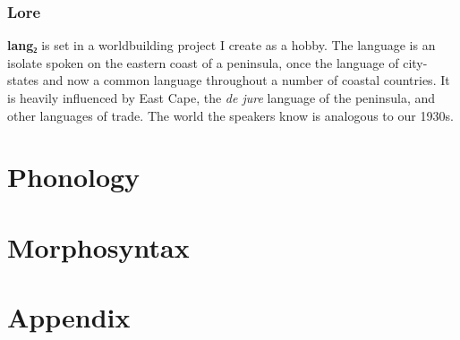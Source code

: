\documentclass[fontsize=12pt,twoside=false,numbers=noenddot]{kaobook}
\newcommand{\langname}{\textbf{lang₂}}
\begin{document}
\section{Lore}
\langname{} is set in a worldbuilding project I create as a hobby. The language is an isolate spoken on the eastern coast of a peninsula, once the language of city-states and now a common language throughout a number of coastal countries. It is heavily influenced by East Cape, the \emph{de jure} language of the peninsula, and other languages of trade. The world the speakers know is analogous to our 1930s.

\mainmatter

 \part{Phonology} 



 \part{Morphosyntax} 









 \part{Appendix} 

\appendix





\backmatter
{}
\end{document}
